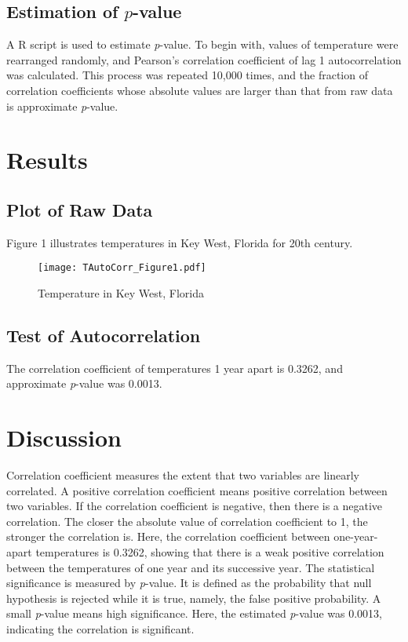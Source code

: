 \documentclass[12pt]{article}
\begin{document}
    \subsection{Estimation of \texorpdfstring{$\mathit{p}$}{}-value}
    A R script is used to estimate \textit{p}-value. To begin with, values of temperature were
    rearranged randomly, and Pearson's correlation coefficient of lag 1 autocorrelation was calculated.
    This process was repeated 10,000 times, and the fraction of correlation coefficients whose absolute 
    values are larger than that from raw data is approximate \textit{p}-value.
  
  \section{Results}
    
    \subsection{Plot of Raw Data}
    Figure 1 illustrates temperatures in Key West, Florida for 20th century.
    \begin{figure}[H]
        \centering
        \texttt{[image: TAutoCorr\_Figure1.pdf]}
        \caption{Temperature in Key West, Florida}
        \label{Fig. 2}    
    \end{figure}

    \subsection{Test of Autocorrelation}
    The correlation coefficient of temperatures 1 year apart is 0.3262, and approximate 
    \textit{p}-value was 0.0013.

  \section{Discussion}
  Correlation coefficient measures the extent that two variables are linearly correlated.
  A positive correlation coefficient means positive correlation between two variables. If 
  the correlation coefficient is negative, then there is a negative correlation. The closer
  the absolute value of correlation coefficient to 1, the stronger the correlation is. Here, the
  correlation coefficient between one-year-apart temperatures is 0.3262, showing that there is a weak 
  positive correlation between the temperatures of one year and its successive year.
  \newline
  The statistical significance is measured by \textit{p}-value. It is defined as the probability that
  null hypothesis is rejected while it is true, namely, the false positive probability. A 
  small \textit{p}-value means high significance. Here, the 
  estimated \textit{p}-value was 0.0013, indicating the correlation is significant.
\end{document}
